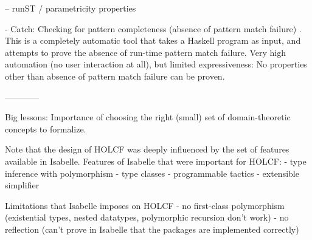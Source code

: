 -- runST / parametricity properties

- Catch: Checking for pattern completeness (absence of pattern match failure) \cite{Mitchell2008}. This is a completely automatic tool that takes a Haskell program as input, and attempts to prove the absence of run-time pattern match failure. Very high automation (no user interaction at all), but limited expressiveness: No properties other than absence of pattern match failure can be proven.


------------

Big lessons: Importance of choosing the right (small) set of domain-theoretic concepts to formalize. 


Note that the design of HOLCF was deeply influenced by the set of features available in Isabelle.
Features of Isabelle that were important for HOLCF:
- type inference with polymorphism
- type classes
- programmable tactics
- extensible simplifier

Limitations that Isabelle imposes on HOLCF
- no first-class polymorphism (existential types, nested datatypes, polymorphic recursion don't work)
- no reflection (can't prove in Isabelle that the packages are implemented correctly)

